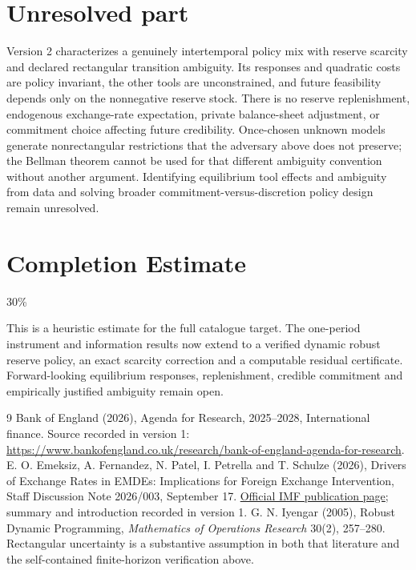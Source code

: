 \documentclass[11pt]{article}
\theoremstyle{definition}
\begin{document}
\section*{Unresolved part}
Version 2 characterizes a genuinely intertemporal policy mix with reserve
scarcity and declared rectangular transition ambiguity. Its responses and
quadratic costs are policy invariant, the other tools are unconstrained,
and future feasibility depends only on the nonnegative reserve stock.
There is no reserve replenishment, endogenous exchange-rate expectation,
private balance-sheet adjustment, or commitment choice affecting future
credibility. Once-chosen unknown models generate nonrectangular restrictions
that the adversary above does not preserve; the Bellman theorem cannot be
used for that different ambiguity convention without another argument.
Identifying equilibrium tool effects and ambiguity from data and solving
broader commitment-versus-discretion policy design remain unresolved.
\section{Completion Estimate}
30\%

This is a heuristic estimate for the full catalogue target. The one-period
instrument and information results now extend to a verified dynamic robust
reserve policy, an exact scarcity correction and a computable residual
certificate. Forward-looking equilibrium responses, replenishment, credible
commitment and empirically justified ambiguity remain open.

\begin{thebibliography}{9}
 Bank of England (2026), Agenda for Research, 2025--2028, International finance. Source recorded in version 1: \url{https://www.bankofengland.co.uk/research/bank-of-england-agenda-for-research}.
 E. O. Emeksiz, A. Fernandez, N. Patel, I. Petrella and T. Schulze (2026), Drivers of Exchange Rates in EMDEs: Implications for Foreign Exchange Intervention, Staff Discussion Note 2026/003, September 17. \href{https://www.imf.org/en/publications/staff-discussion-notes/issues/2026/09/16/drivers-of-exchange-rates-in-emdes-implications-for-foreign-exchange-intervention-578715}{Official IMF publication page}; summary and introduction recorded in version 1.
 G. N. Iyengar (2005), Robust Dynamic Programming,
\emph{Mathematics of Operations Research} 30(2), 257--280.
Rectangular uncertainty is a substantive assumption in both that literature
and the self-contained finite-horizon verification above.
\end{thebibliography}
\end{document}
